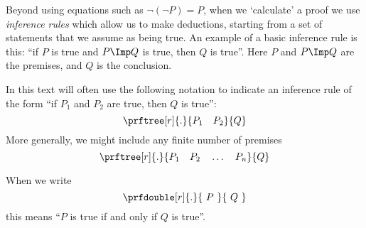 Beyond using equations such as $\lnot (\lnot P) = P$, when we `calculate' a proof we use \emph{inference rules} which allow us to make deductions, starting from a set of statements that we assume as being true.
An example of a basic inference rule is this: ``if $P$ is true and $P \Imp Q$ is true, then $Q$ is true''.
Here $P$ and $P \Imp Q$ are the premises, and $Q$ is the conclusion.

In this text will often use the following notation to indicate an inference rule of the form ``if $P_1$ and $P_2$ are true, then $Q$ is true'':
\begin{equation}
    \prftree[r]{.
    }{
        P_1 \quad P_2
    }{
        Q
    }
\end{equation}
More generally, we might include any finite number of premises
\begin{equation}
    \prftree[r]{.
    }{
        P_1 \quad P_2 \quad \dots \quad P_n
    }{
        Q
    }
\end{equation}

When we write
\begin{equation}
    \prfdouble[r]{.
    }{
        \ P \
    }{
        \ Q \
    }
\end{equation}
this means ``$P$ is true if and only if $Q$ is true''.


